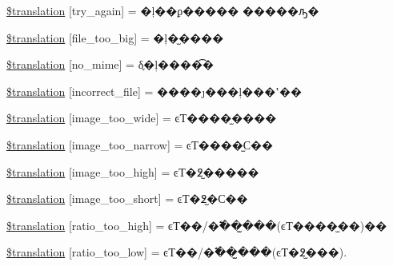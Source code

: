 \begin{DoxyCompactItemize}
\item 
\hyperlink{class_8upload_8zh___c_n_8gb-2312_8php_a3afc377bd803683314f413a814243066}{\$translation} \mbox{[}\textquotesingle{}try\+\_\+again\textquotesingle{}\mbox{]} = \textquotesingle{}�ļ��ϼ����� �����ԡ�\textquotesingle{}
\item 
\hyperlink{class_8upload_8zh___c_n_8gb-2312_8php_a476278eb4a0c3df56af068e2d511a741}{\$translation} \mbox{[}\textquotesingle{}file\+\_\+too\+\_\+big\textquotesingle{}\mbox{]} = \textquotesingle{}�ļ�̫����\textquotesingle{}
\item 
\hyperlink{class_8upload_8zh___c_n_8gb-2312_8php_a191a55df8e3bb7f3c51b70f3c1932e02}{\$translation} \mbox{[}\textquotesingle{}no\+\_\+mime\textquotesingle{}\mbox{]} = \textquotesingle{}δ֪�ļ����͡�\textquotesingle{}
\item 
\hyperlink{class_8upload_8zh___c_n_8gb-2312_8php_a4d32343e2699edd6fd435f9c832cb9c7}{\$translation} \mbox{[}\textquotesingle{}incorrect\+\_\+file\textquotesingle{}\mbox{]} = \textquotesingle{}����ȷ���ļ���ʽ��\textquotesingle{}
\item 
\hyperlink{class_8upload_8zh___c_n_8gb-2312_8php_a0dd3e4930ca1f59ae280f4b1006525cd}{\$translation} \mbox{[}\textquotesingle{}image\+\_\+too\+\_\+wide\textquotesingle{}\mbox{]} = \textquotesingle{}ͼƬ����̫����\textquotesingle{}
\item 
\hyperlink{class_8upload_8zh___c_n_8gb-2312_8php_a5c9a4cd67fd21c32e0a3b434591a6037}{\$translation} \mbox{[}\textquotesingle{}image\+\_\+too\+\_\+narrow\textquotesingle{}\mbox{]} = \textquotesingle{}ͼƬ����̫С��\textquotesingle{}
\item 
\hyperlink{class_8upload_8zh___c_n_8gb-2312_8php_aa27bde361343f3b63c7cd441860024f8}{\$translation} \mbox{[}\textquotesingle{}image\+\_\+too\+\_\+high\textquotesingle{}\mbox{]} = \textquotesingle{}ͼƬ�߶�̫����\textquotesingle{}
\item 
\hyperlink{class_8upload_8zh___c_n_8gb-2312_8php_a86fcd4e1157b00032df451188d735527}{\$translation} \mbox{[}\textquotesingle{}image\+\_\+too\+\_\+short\textquotesingle{}\mbox{]} = \textquotesingle{}ͼƬ�߶�̫С��\textquotesingle{}
\item 
\hyperlink{class_8upload_8zh___c_n_8gb-2312_8php_a23396f6ce7f31e5e5f1b57580621d982}{\$translation} \mbox{[}\textquotesingle{}ratio\+\_\+too\+\_\+high\textquotesingle{}\mbox{]} = \textquotesingle{}ͼƬ��/�߱���̫��(ͼƬ����̫��)��\textquotesingle{}
\item 
\hyperlink{class_8upload_8zh___c_n_8gb-2312_8php_ac533b9a479f056b0b8623e4268f068c2}{\$translation} \mbox{[}\textquotesingle{}ratio\+\_\+too\+\_\+low\textquotesingle{}\mbox{]} = \textquotesingle{}ͼƬ��/�߱���̫��(ͼƬ�߶�̫��).\textquotesingle{}

\end{DoxyCompactItemize}
